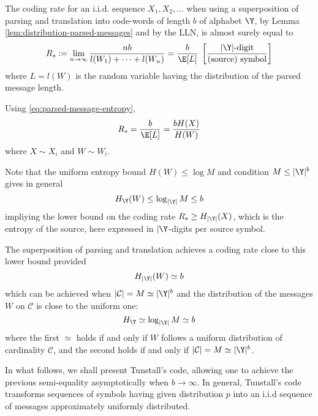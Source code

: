 \documentclass[toc]{../cs-classes/cs-classes}
\begin{document}
\begin{property}
    The coding rate for an i.i.d. sequence $X_1, X_2, \dots$ when using a superposition of parsing and translation into code-words of length $b$ of alphabet $\Y$, by Lemma \ref{lem:distribution-parsed-messages} and by the LLN, is almost surely equal to
    \begin{equation}
        \label{eq:parsing-conding-rate-def}
        R_s := \lim_{n\to\infty} \frac{nb}{l(W_1)+\dots+l(W_n)} = \frac{b}{\E[L]} \; \left[\frac{|\Y|\textnormal{-digit}}{\textnormal{(source) symbol}}\right]
    \end{equation}
    where $L=l(W)$ is the random variable having the distribution of the parsed message length.

    Using \eqref{eq:parsed-message-entropy},
    \begin{equation*}
        R_s = \frac{b}{\E[L]} = \frac{bH(X)}{H(W)}
    \end{equation*}
    where $X\sim X_i$ and $W\sim W_i$.
\end{property}

\begin{remark}
    Note that the uniform entropy bound $H(W)\leq\log M$ and condition $M\leq|\Y|^b$ gives in general
    \begin{equation*}
        H_{\Y}(W)\leq\log_{|\Y|} M\leq b
    \end{equation*}
    impliying the lower bound on the coding rate $R_s\geq H_{|\Y|}(X)$, which is the entropy of the source, here expressed in $|\Y$-digits per source symbol.
\end{remark}

The superposition of parsing and translation achieves a coding rate close to this lower bound provided
\begin{equation}
    \label{eq:entropy-sim-b}
    H_{|\Y|}(W) \simeq b
\end{equation}
which can be achieved when $|\mathcal{C}| = M \simeq |\Y|^b$ and the distribution of the messages $W$ on $\mathcal{C}$ is close to the uniform one:
\begin{equation*}
    H_{\Y} \simeq \log_{|\Y|}M \simeq b
\end{equation*}
where the first $\simeq$ holds if and only if $W$ follows a uniform distribution of cardinality $\mathcal{C}$, and the second holds if and only if $|\mathcal{C}|=M\simeq|\Y|^b$.

In what follows, we shall present Tunstall's code, allowing one to achieve the previous semi-equality asymptotically when $b\to\infty$. In general, Tunstall's code transforms sequences of symbols having given distribution $p$ into an i.i.d sequence of messages approximately uniformly distributed.
\end{document}
